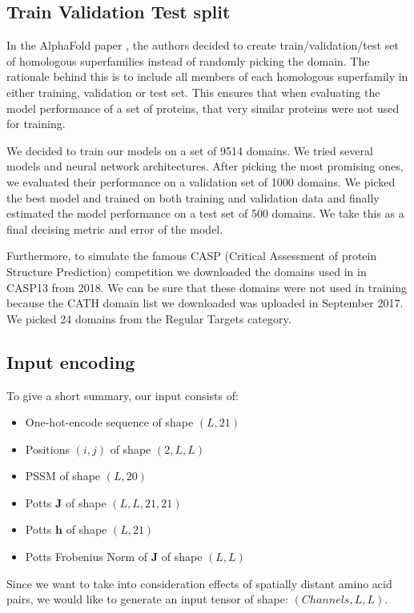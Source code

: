 \subsection{Train Validation Test split}
    
In the AlphaFold paper \cite{alphafold}, the authors decided to create train/validation/test set of homologous superfamilies instead of randomly picking the domain. 
The rationale behind this is to include all members of each homologous superfamily in either training, validation or test set. 
This ensures that when evaluating the model performance of a set of proteins, that very similar proteins were not used for training. 
    
We decided to train our models on a set of 9514 domains. 
We tried several models and neural network architectures. 
After picking the most promising ones, we evaluated their performance on a validation set of 1000 domains. 
We picked the best model and trained on both training and validation data and finally estimated the model performance on a test set of 500 domains. 
We take this as a final decising metric and error of the model. 
    
Furthermore, to simulate the famous CASP (Critical Assessment of protein Structure Prediction) competition we downloaded the domains used in in CASP13 from 2018. 
We can be sure that these domains were not used in training because the CATH domain list we downloaded was uploaded in September 2017. 
We picked 24 domains from the Regular Targets category.
    
\subsection{Input encoding}
To give a short summary, our input consists of:
    
\begin{itemize}
    \item One-hot-encode sequence of shape $(L, 21)$
    \item Positions $(i, j)$ of shape $(2, L, L)$
    \item PSSM of shape $(L, 20)$
    \item Potts $\bm{J}$ of shape $(L, L, 21, 21)$
    \item Potts $\bm{h}$ of shape $(L, 21)$
    \item Potts Frobenius Norm of $\bm{J}$ of shape $(L, L)$
\end{itemize}
        
Since we want to take into consideration effects of spatially distant amino acid pairs, we would like to generate an input tensor of shape: $(Channels, L, L)$.
    
